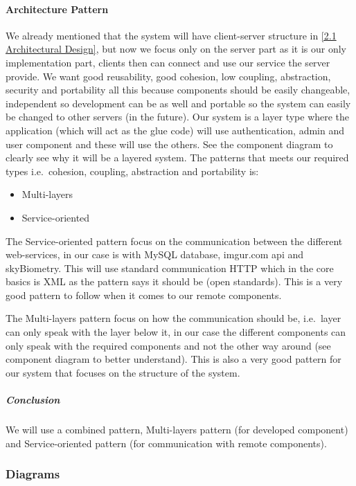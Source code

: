 \documentclass[a4paper,11pt]{article}
\begin{document}
\paragraph{Architecture Pattern}\label{architecture-pattern}

We already mentioned that the system will have client-server structure in \ref{2.1 Architectural Design}, but now we focus only on the server part as it is our only implementation part, clients then can connect and use our service the server provide.
We want good reusability, good cohesion, low coupling, abstraction, security and
portability all this because components should be easily changeable,
independent so development can be as well and portable so the system can
easily be changed to other servers (in the future). Our system is a
layer type where the application (which will act as the glue code) will
use authentication, admin and user component and these will use the
others. See the component diagram to clearly see why it will be a
layered system. The patterns that meets our required types
i.e.~cohesion, coupling, abstraction and portability is:

\begin{itemize}
\item
  Multi-layers
\item
  Service-oriented
\end{itemize}

The Service-oriented pattern focus on the communication between the
different web-services, in our case is with MySQL database, imgur.com
api and skyBiometry. This will use standard communication HTTP which in
the core basics is XML as the pattern says it should be (open
standards). This is a very good pattern to follow when it comes to our
remote components.

The Multi-layers pattern focus on how the communication should be,
i.e.~layer can only speak with the layer below it, in our case the
different components can only speak with the required components and not
the other way around (see component diagram to better understand). This
is also a very good pattern for our system that focuses on the structure
of the system.

\subparagraph{Conclusion}\label{conclusion}

We will use a combined pattern, Multi-layers pattern (for developed
component) and Service-oriented pattern (for communication with remote
components).

\newpage

\subsubsection{Diagrams}\label{diagrams}
\end{document}
